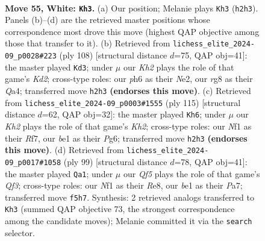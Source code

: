 \documentclass[11pt]{article}
\begin{document}
\clearpage

\begin{figure}[p]\centering
\begin{subfigure}{0.46\textwidth}\centering
\resizebox{\linewidth}{!}{%
\newchessgame
\chessboard[
  setfen={r5r1/p1k1q1p1/7p/3p1Q1P/p2P2P1/4P3/7K/4bN2 w - - 18 55},
  showmover=false,
  pgfstyle=straightmove, color=movearrow, markmove={h2-h3}
]}
\caption{}
\end{subfigure}\hfill
\begin{subfigure}{0.46\textwidth}\centering
\resizebox{\linewidth}{!}{%
\newchessgame
\chessboard[
  setfen={2r3k1/3R1p1p/4p1p1/2q1P1P1/Q4P1P/8/2PKN3/8 w - - 3 55},
  showmover=false,
  pgfstyle=straightmove, color=movearrow, markmove={d2-d3}
]}
\caption{}
\end{subfigure}
\\[4pt]
\begin{subfigure}{0.46\textwidth}\centering
\resizebox{\linewidth}{!}{%
\newchessgame
\chessboard[
  setfen={8/5r1k/3p2p1/2pP4/2P2q2/1P4pP/6P1/4Q1RK b - - 6 58},
  showmover=false,
  pgfstyle=straightmove, color=movearrow, markmove={h7-h6}
]}
\caption{}
\end{subfigure}\hfill
\begin{subfigure}{0.46\textwidth}\centering
\resizebox{\linewidth}{!}{%
\newchessgame
\chessboard[
  setfen={4r3/p5pk/5q1p/2PR1p2/1P2p2P/6P1/3Q1P1K/8 b - - 0 50},
  showmover=false,
  pgfstyle=straightmove, color=movearrow, markmove={f6-a1}
]}
\caption{}
\end{subfigure}
\caption{\textbf{Move 55, White: \texttt{Kh3}.} (a) Our position; Melanie plays \texttt{Kh3} (\texttt{h2h3}). Panels (b)--(d) are the retrieved master positions whose correspondence most drove this move (highest QAP objective among those that transfer to it). (b) Retrieved from \texttt{lichess\_elite\_2024-09\_p0028\#223} (ply 108) [structural distance $d$=75, QAP obj=41]: the master played \texttt{Kd3}; under $\mu$ our \emph{Kh2} plays the role of that game's \emph{Kd2}; cross-type roles: our \emph{p}h6 as their \emph{N}e2, our \emph{r}g8 as their \emph{Q}a4; transferred move \texttt{h2h3} \textbf{(endorses this move)}. (c) Retrieved from \texttt{lichess\_elite\_2024-09\_p0003\#1555} (ply 115) [structural distance $d$=62, QAP obj=32]: the master played \texttt{Kh6}; under $\mu$ our \emph{Kh2} plays the role of that game's \emph{Kh2}; cross-type roles: our \emph{N}f1 as their \emph{R}f7, our \emph{b}e1 as their \emph{P}g6; transferred move \texttt{h2h3} \textbf{(endorses this move)}. (d) Retrieved from \texttt{lichess\_elite\_2024-09\_p0017\#1058} (ply 99) [structural distance $d$=78, QAP obj=41]: the master played \texttt{Qa1}; under $\mu$ our \emph{Qf5} plays the role of that game's \emph{Qf3}; cross-type roles: our \emph{N}f1 as their \emph{R}e8, our \emph{b}e1 as their \emph{P}a7; transferred move \texttt{f5h7}. Synthesis: 2 retrieved analogs transferred to \texttt{Kh3} (summed QAP objective 73, the strongest correspondence among the candidate moves); Melanie committed it via the \texttt{search} selector.}
\label{fig:thought-m108}
\end{figure}
\end{document}
